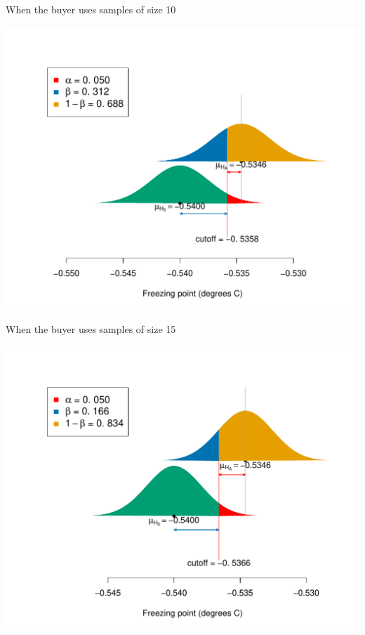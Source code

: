 \documentclass[10pt,handout]{beamer}\usepackage[]{graphicx}\usepackage[]{color}
\makeatletter
\def\maxwidth{ %
  \ifdim\Gin@nat@width>\linewidth
    \linewidth
  \else
    \Gin@nat@width
  \fi
}
\newenvironment{knitrout}{}{} %
\makeatother
\begin{document}
\begin{frame}[fragile]{When the buyer uses samples of size 10}
\begin{knitrout}\tiny
{}\color{fgcolor}

{\centering \includegraphics[width=\maxwidth]{figure/unnamed-chunk-12-1} 

}



\end{knitrout}
\end{frame}

\begin{frame}[fragile]{When the buyer uses samples of size 15}
\begin{knitrout}\tiny
{}\color{fgcolor}

{\centering \includegraphics[width=\maxwidth]{figure/unnamed-chunk-13-1} 

}



\end{knitrout}
\end{frame}
\end{document}
